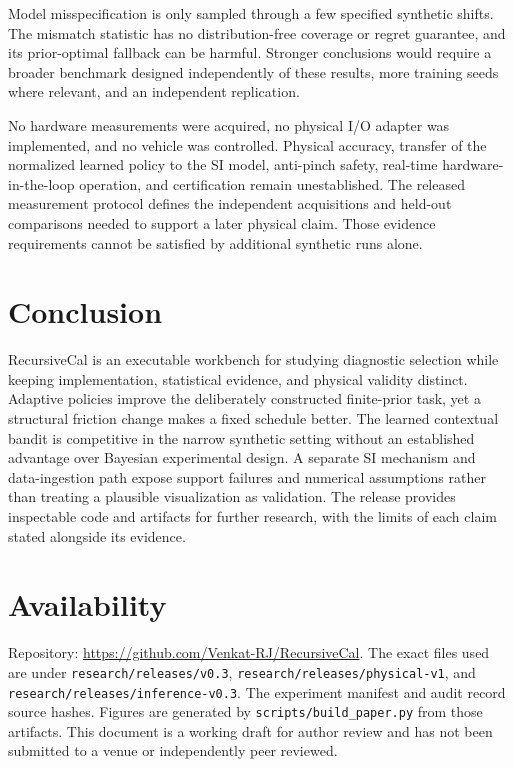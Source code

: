 \documentclass[
  10pt,
]{article}
\begin{document}
Model misspecification is only sampled through a few specified synthetic
shifts. The mismatch statistic has no distribution-free coverage or
regret guarantee, and its prior-optimal fallback can be harmful.
Stronger conclusions would require a broader benchmark designed
independently of these results, more training seeds where relevant, and
an independent replication.

No hardware measurements were acquired, no physical I/O adapter was
implemented, and no vehicle was controlled. Physical accuracy, transfer
of the normalized learned policy to the SI model, anti-pinch safety,
real-time hardware-in-the-loop operation, and certification remain
unestablished. The released measurement protocol defines the independent
acquisitions and held-out comparisons needed to support a later physical
claim. Those evidence requirements cannot be satisfied by additional
synthetic runs alone.

\section{Conclusion}\label{conclusion}

RecursiveCal is an executable workbench for studying diagnostic
selection while keeping implementation, statistical evidence, and
physical validity distinct. Adaptive policies improve the deliberately
constructed finite-prior task, yet a structural friction change makes a
fixed schedule better. The learned contextual bandit is competitive in
the narrow synthetic setting without an established advantage over
Bayesian experimental design. A separate SI mechanism and data-ingestion
path expose support failures and numerical assumptions rather than
treating a plausible visualization as validation. The release provides
inspectable code and artifacts for further research, with the limits of
each claim stated alongside its evidence.

\section{Availability}\label{availability}

Repository: \url{https://github.com/Venkat-RJ/RecursiveCal}. The exact
files used are under \texttt{research/releases/v0.3},
\texttt{research/releases/physical-v1}, and
\texttt{research/releases/inference-v0.3}. The experiment manifest and
audit record source hashes. Figures are generated by
\texttt{scripts/build\_paper.py} from those artifacts. This document is
a working draft for author review and has not been submitted to a venue
or independently peer reviewed.
\end{document}
